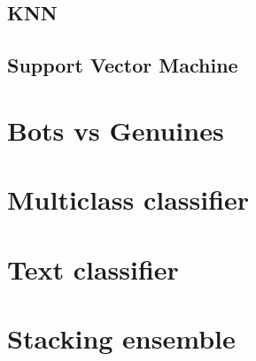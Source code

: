 \subsection{KNN}
\subsection{Support Vector Machine}
\section{Bots vs Genuines}
\section{Multiclass classifier}
\section{Text classifier}
\section{Stacking ensemble}
